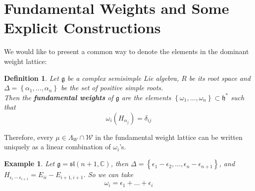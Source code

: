 \documentclass[11pt]{book}
\newtheorem{example}[theorem]{Example}
\newtheorem{definition}[theorem]{Definition}
\newcommand{\bb}[1]{\mathbb{#1}}
\newcommand{\mc}[1]{\mathcal{#1}}
\newcommand{\mf}[1]{\mathfrak{#1}}
\begin{document}
\section{Fundamental Weights and Some Explicit Constructions}
We would like to present a common way to denote the elements in the dominant weight lattice:
\begin{definition}
Let $\mf{g}$ be a complex semisimple Lie algebra, $R$ be its root space and $\Delta = \left\{ \alpha_1, \dots, \alpha_n\right\}$ be the set of positive simple roots.\\
Then the \textbf{fundamental weights} of $\mf{g}$ are the elements $\left\{ \omega_1, \dots, \omega_n \right\} \subset \mf{h}^*$ such that
$$\omega_i(H_{\alpha_j}) = \delta_{ij}$$
\end{definition}
Therefore, every $\mu \in \Lambda_W \cap \mc{W}$ in the fundamental weight lattice can be written uniquely as a linear combination of $\omega_i$'s.

\begin{example}
Let $\mf{g} = \mf{sl}(n+1,\bb{C})$, then $\Delta = \left\{\epsilon_1 - \epsilon_2, \dots, \epsilon_n - \epsilon_{n+1}\right\}$, and $H_{\epsilon_i - \epsilon_{i+1}} = E_{ii} - E_{i+1,i+1}$. So we can take
$$\omega_i = \epsilon_1 + \dots + \epsilon_i$$
\end{example}
\end{document}

